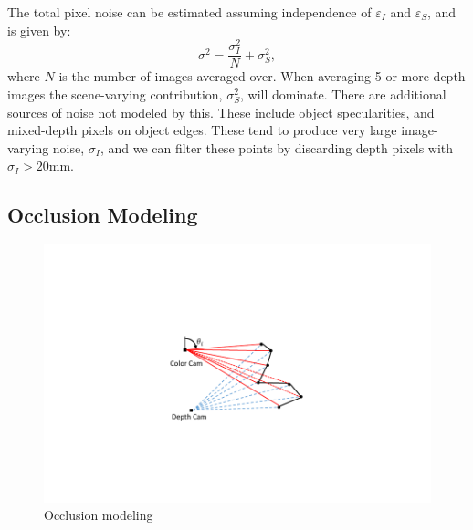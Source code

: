 The total pixel noise can be estimated assuming independence of $\varepsilon_I$ and $\varepsilon_S$, and is given by:
\begin{equation}
\sigma^2 = \frac{\sigma_I^2}{N} + \sigma_S^2,\label{eq:sigma}
\end{equation}
where $N$ is the number of images averaged over.  When averaging 5 or more depth images the scene-varying contribution, $\sigma_S^2$, will dominate.  There are additional sources of noise not modeled by this.  These include object specularities, and mixed-depth pixels on object edges.  These tend to produce very large image-varying noise, $\sigma_I$, and we can filter these points by discarding depth pixels with $\sigma_I>20$mm.  

\subsection{Occlusion Modeling}


\begin{figure}
\begin{center}
   \includegraphics[trim=130 90 140 90,clip,width=0.75\linewidth]{Figures/OcclusionModeling}
\end{center}
   \caption{Occlusion modeling }
\label{fig:triangle}
\end{figure}


